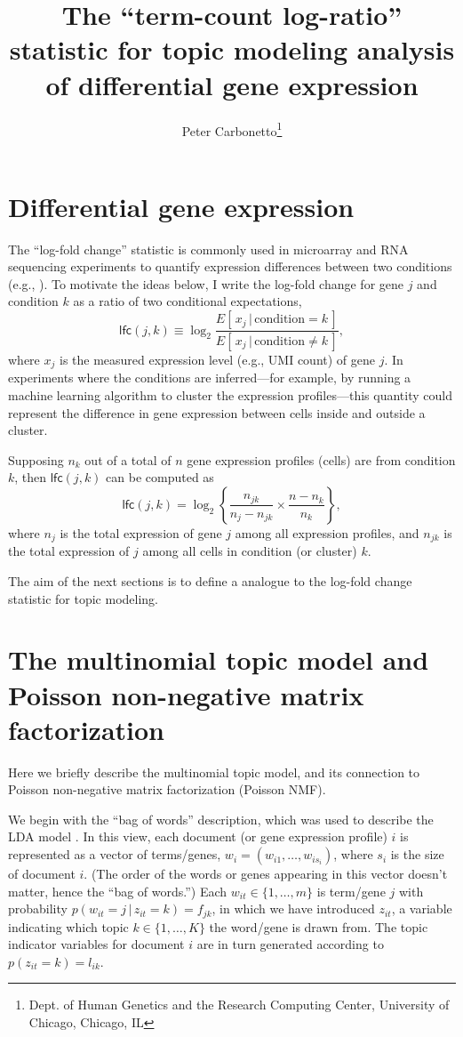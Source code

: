\documentclass[final]{siamart171218}
\title{The ``term-count log-ratio'' statistic for topic modeling analysis
  of differential gene expression}
\author{Peter Carbonetto\thanks{Dept. of Human Genetics and the Research Computing Center, University of Chicago, Chicago, IL}}
\begin{document}
\maketitle

\section{Differential gene expression}

The ``log-fold change'' statistic is commonly used in microarray and
RNA sequencing experiments to quantify expression differences between
two conditions (e.g., \cite{cui-churchill-2003, quackenbush-2002}). To
motivate the ideas below, I write the log-fold change for gene $j$ and
condition $k$ as a ratio of two conditional expectations,
\begin{equation}
\mathsf{lfc}(j,k) \equiv
\log_2 \frac{E[\,x_j \,|\, \mathrm{condition} = k\,]}
            {E[\,x_j \,|\, \mathrm{condition} \neq k\,]},
\end{equation}
where $x_j$ is the measured expression level (e.g., UMI count) of gene
$j$. In experiments where the conditions are inferred---for example,
by running a machine learning algorithm to cluster the expression
profiles---this quantity could represent the difference in gene
expression between cells inside and outside a cluster.

Supposing $n_k$ out of a total of $n$ gene expression profiles
(cells) are from condition $k$, then $\mathsf{lfc}(j,k)$ can be
computed as
\begin{equation}
\mathsf{lfc}(j,k) =
\log_2 \left\{\frac{n_{jk}}{n_j - n_{jk}} \times \frac{n - n_k}{n_k} \right\},
\end{equation}
where $n_j$ is the total expression of gene $j$ among all expression
profiles, and $n_{jk}$ is the total expression of $j$ among all cells
in condition (or cluster) $k$.

The aim of the next sections is to define a analogue to the log-fold
change statistic for topic modeling.

\section{The multinomial topic model and Poisson non-negative matrix
  factorization}

Here we briefly describe the multinomial topic model, and its
connection to Poisson non-negative matrix factorization (Poisson NMF).

We begin with the ``bag of words'' description, which was used to
describe the LDA model \cite{blei-2003}. In this view, each document
(or gene expression profile) $i$ is represented as a vector of
terms/genes, $w_i = (w_{i1}, \ldots, w_{is_i})$, where $s_i$ is the
size of document $i$. (The order of the words or genes appearing in
this vector doesn't matter, hence the ``bag of words.'') Each $w_{it}
\in \{1, \ldots, m\}$ is term/gene $j$ with probability
$p(w_{it} = j \,|\, z_{it} = k) = f_{jk}$, in which we have introduced
$z_{it}$, a variable indicating which topic $k \in \{1, \ldots, K\}$
the word/gene is drawn from. The topic indicator variables for
document $i$ are in turn generated according to $p(z_{it} = k) =
l_{ik}$.
\end{document}

